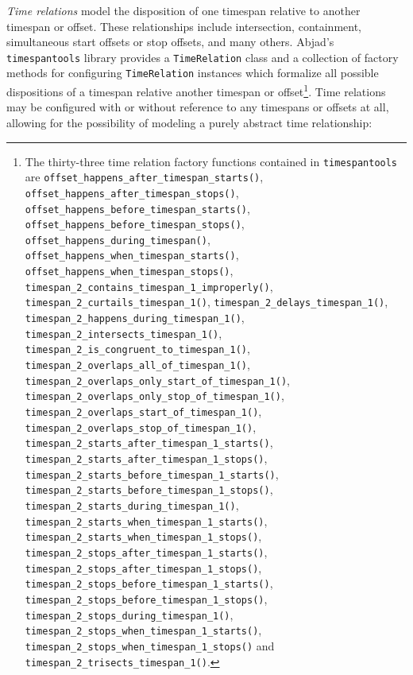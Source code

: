 \emph{Time relations} model the disposition of one timespan relative to
another timespan or offset. These relationships include intersection,
containment, simultaneous start offsets or stop offsets, and many others.
Abjad's \texttt{timespantools} library provides a \texttt{TimeRelation} class
and a collection of factory methods for configuring \texttt{TimeRelation}
instances which formalize all possible dispositions of a timespan relative
another timespan or offset\footnote{The thirty-three time relation factory
functions contained in \texttt{timespantools} are
\texttt{offset\_happens\_after\_timespan\_starts()},
\texttt{offset\_happens\_after\_timespan\_stops()},
\texttt{offset\_happens\_before\_timespan\_starts()},
\texttt{offset\_happens\_before\_timespan\_stops()},
\texttt{offset\_happens\_during\_timespan()},
\texttt{offset\_happens\_when\_timespan\_starts()},
\texttt{offset\_happens\_when\_timespan\_stops()},
\texttt{timespan\_2\_contains\_timespan\_1\_improperly()},
\texttt{timespan\_2\_curtails\_timespan\_1()},
\texttt{timespan\_2\_delays\_timespan\_1()},
\texttt{timespan\_2\_happens\_during\_timespan\_1()},
\texttt{timespan\_2\_intersects\_timespan\_1()},
\texttt{timespan\_2\_is\_congruent\_to\_timespan\_1()},
\texttt{timespan\_2\_overlaps\_all\_of\_timespan\_1()},
\texttt{timespan\_2\_overlaps\_only\_start\_of\_timespan\_1()},
\texttt{timespan\_2\_overlaps\_only\_stop\_of\_timespan\_1()},
\texttt{timespan\_2\_overlaps\_start\_of\_timespan\_1()},
\texttt{timespan\_2\_overlaps\_stop\_of\_timespan\_1()},
\texttt{timespan\_2\_starts\_after\_timespan\_1\_starts()},
\texttt{timespan\_2\_starts\_after\_timespan\_1\_stops()},
\texttt{timespan\_2\_starts\_before\_timespan\_1\_starts()},
\texttt{timespan\_2\_starts\_before\_timespan\_1\_stops()},
\texttt{timespan\_2\_starts\_during\_timespan\_1()},
\texttt{timespan\_2\_starts\_when\_timespan\_1\_starts()},
\texttt{timespan\_2\_starts\_when\_timespan\_1\_stops()},
\texttt{timespan\_2\_stops\_after\_timespan\_1\_starts()},
\texttt{timespan\_2\_stops\_after\_timespan\_1\_stops()},
\texttt{timespan\_2\_stops\_before\_timespan\_1\_starts()},
\texttt{timespan\_2\_stops\_before\_timespan\_1\_stops()},
\texttt{timespan\_2\_stops\_during\_timespan\_1()},
\texttt{timespan\_2\_stops\_when\_timespan\_1\_starts()},
\texttt{timespan\_2\_stops\_when\_timespan\_1\_stops()} and
\texttt{timespan\_2\_trisects\_timespan\_1()}. }. Time relations may be
configured with or without reference to any timespans or offsets at all,
allowing for the possibility of modeling a purely abstract time relationship:

